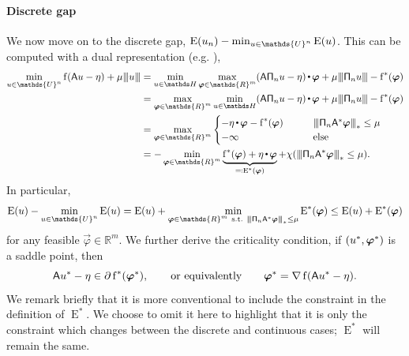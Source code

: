 \documentclass[smallextended]{svjour3}
\let\F\mathds\let\C\mathcal\newcommand{\R}{\F{R}}\newcommand{\A}{\tens{A}}
\newcommand{\Norm}[1]{{\left\vert\kern-0.25ex\left\vert\kern-0.25ex\left\vert #1 \right\vert\kern-0.25ex\right\vert\kern-0.25ex\right\vert}}
\newcommand{\ip}[2]{#1 \vcenter{\hbox{\resizebox{6pt}{!}{\ensuremath\cdot}}} #2}
\newcommand{\op}[1]{\operatorname{#1}}
\newcommand{\splitln}[4]{\begin{cases} #1 & #2 \\ #3 & #4\end{cases}}
\newcommand{\1}{\F{1}}
\DeclareMathOperator{\st}{\;s.t.\;}
\newcommand{\data}{\eta}
\newcommand*{\var}[1]{%
	\IfEqCase{#1}{%
		{0}{u}%
		{1}{v}%
		{2}{w}%
	}[u#1]%
}
\begin{document}
	\paragraph{Discrete gap}
	We now move on to the discrete gap, $\op{E}(\var0_n)-\min_{\var0\in\F{U}^n}\op{E}(\var0)$. This can be computed with a dual representation (e.g. \cite{Duval2017a}),
	\begin{align}
		\min_{\var0\in \F{U}^n} \op{f}(\A\var0-\data) + \mu\Norm{\var0} &= \min_{\var0\in\F H}\max_{\vec{\varphi}\in\R^m} \ip{(\A\tens{\Pi}_n\var0-\data)}{ \vec{\varphi}} +\mu\Norm{\tens{\Pi}_n\var0} -\op{f}^*(\vec{\varphi})
		\\&= \max_{\vec{\varphi}\in\R^m}\min_{\var0\in\F H} \ip{(\A\tens{\Pi}_n\var0-\data)}{\vec{\varphi}} +\mu\Norm{\tens{\Pi}_n\var0} -\op{f}^*(\vec{\varphi})
		\\&= \max_{\vec{\varphi}\in\R^m} \splitln{-\ip{\data}{\vec{\varphi}} -\op{f}^*(\vec{\varphi})}{\qquad\Norm{\tens{\Pi}_n\A^*\vec{\varphi}}_*\leq \mu}{-\infty}{\qquad\text{else}}
		\\&= -\min_{\vec{\varphi}\in\R^m} \underbrace{\op{f}^*(\vec{\varphi})+\ip{\data}{\vec{\varphi}}}_{\eqqcolon \op{E}^*(\vec{\varphi})}  + \chi(\Norm{\tens{\Pi}_n\A^*\vec{\varphi}}_*\leq \mu).
	\end{align}
	In particular,
	\begin{equation}
		\op{E}(\var0) - \min_{\var0\in\F{U}^n}\op{E}(\var0) = \op{E}(\var0) + \min_{\vec{\varphi}\in\R^m\st \Norm{\tens{\Pi}_n\A^*\vec{\varphi}}_*\leq \mu} \op{E}^*(\vec{\varphi}) \leq \op{E}(\var0) + \op{E}^*(\vec{\varphi})
	\end{equation}
	for any feasible $\vec{\varphi}\in\R^m$. We further derive the criticality condition, if $(\var0^*,\vec{\varphi}^*)$ is a saddle point, then
	\begin{equation}
		\A\var0^*-\data\in\partial\op{f}^*(\vec{\varphi}^*),\qquad\text{or equivalently}\qquad
		\vec{\varphi}^* = \nabla\op{f}(\A\var0^*-\data).
	\end{equation}
	We remark briefly that it is more conventional to include the constraint in the definition of $\op{E}^*$. We choose to omit it here to highlight that it is only the constraint which changes between the discrete and continuous cases; $\op{E}^*$ will remain the same.
	
\end{document}
